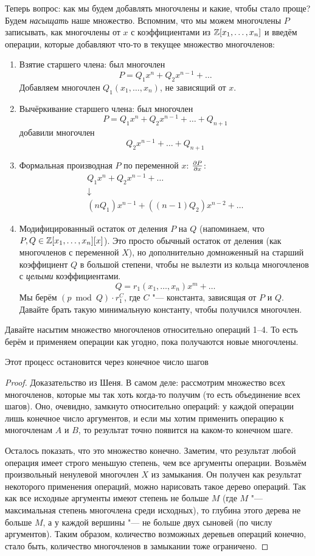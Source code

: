 	Теперь вопрос: как мы будем добавлять многочлены и какие, чтобы стало проще?
	Будем \textit{насыщать} наше множество.
	Вспомним, что мы можем многочлены $P$ записывать, как многочлены от $x$ с коэффициентами из $\mathbb{Z}[x_1, \dots, x_n]$ и
	введём операции, которые добавляют что-то в текущее множество многочленов:
	\begin{enumerate}
	\item
		Взятие старшего члена: был многочлен
		\[ P = Q_1x^n + Q_2x^{n-1} + \dots \]
		Добавляем многочлен $Q_1(x_1, \dots, x_n)$, не зависящий от $x$.
	\item
		Вычёркивание старшего члена: был многочлен
		\[ P = Q_1 x^n + Q_2 x^{n-1} + \dots + Q_{n+1} \]
		добавили многочлен
		\[ Q_2 x^{n-1} + \dots + Q_{n+1} \]
	\item
		Формальная производная $P$ по переменной $x$: $\frac{\partial P}{\partial x}$:
		\begin{gather*}
		Q_1x^n + Q_2x^{n-1} + \dots \\
		\downarrow \\
		(nQ_1)x^{n-1} + ((n-1)Q_2)x^{n-2} + \dots
		\end{gather*}
	\item
		Модифицированный остаток от деления $P$ на $Q$ (напоминаем, что $P, Q \in \mathbb{Z}[x_1, \dots, x_n][x]$).
		Это просто обычный остаток от деления (как многочленов с переменной $X$), но дополнительно домноженный на старший коэффициент $Q$ в большой степени,
		чтобы не вылезти из кольца многочленов с \textsl{целыми} коэффициентами.
		\[ Q = r_1(x_1, \dots, x_n) x^m + \dots \]
		Мы берём $(p \bmod Q) \cdot r_1 ^ C$, где $C$ "--- константа, зависящая от $P$ и $Q$.
		Давайте брать такую минимальную константу, чтобы получился многочлен.
	\end{enumerate}
	Давайте насытим множество многочленов относительно операций 1--4.
	То есть берём и применяем операции как угодно, пока получаются новые многочлены.
	\begin{assertion}
		Этот процесс остановится через конечное число шагов
	\end{assertion}
	\begin{proof}
		Доказательство из Шеня.
		В самом деле: рассмотрим множество всех многочленов, которые мы так хоть когда-то получим (то есть объединение всех шагов).
		Оно, очевидно, замкнуто относительно операций: у каждой операции лишь конечное число аргументов, и если мы хотим применить
		операцию к многочленам $A$ и $B$, то результат точно появится на каком-то конечном шаге.

		Осталось показать, что это множество конечно.
		Заметим, что результат любой операция имеет строго меньшую степень, чем все аргументы операции.
		Возьмём произвольный ненулевой многочлен $X$ из замыкания.
		Он получен как результат некоторого применения операций, можно нарисовать такое дерево операций.
		Так как все исходные аргументы имеют степень не больше $M$ (где $M$ "--- максимальная степень
		многочлена среди исходных), то глубина этого дерева не больше $M$, а у каждой вершины "--- не больше
		двух сыновей (по числу аргументов).
		Таким образом, количество возможных деревьев операций конечно, стало быть, количество многочленов в замыкании тоже ограничено.
	\end{proof}


